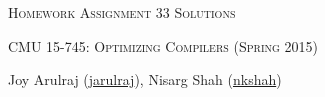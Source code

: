 \documentclass[letterpaper]{article}
\makeatletter
\def \issoln {1}
\newcommand{\email}[1]{\href{mailto:#1@cs.cmu.edu}{#1}}
\makeatother
\begin{document}
\section*{}
\begin{center}
  \centerline{\textsc{\LARGE Homework Assignment 3{\if\issoln 3 Solutions \else \fi}}}
  \vspace{1em}
  \textsc{\large CMU 15-745: Optimizing Compilers (Spring 2015)} \\
  \vspace{3em}
  \centerline{\large{Joy Arulraj (\email{jarulraj}), Nisarg Shah (\email{nkshah})}}
  \vspace{1em}
\end{center}




\end{document}
